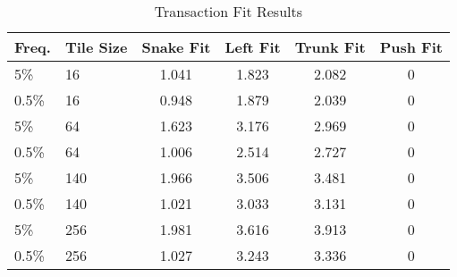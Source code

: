 \begin{table}
	\begin{center}
		\begin{tabular}{|l|l|c|c|c|c|}
			\hline
			Freq. & Tile Size & Snake Fit & Left Fit & Trunk Fit & Push Fit \\
			\hline
			5\% & 16 & 1.041 & 1.823 & 2.082 & 0 \\
			\hline
			0.5\% & 16 & 0.948 & 1.879 & 2.039 & 0 \\
			\hline
			5\% & 64 & 1.623 & 3.176 & 2.969 & 0 \\
			\hline
			0.5\% & 64 & 1.006 & 2.514 & 2.727 & 0 \\
			\hline
			5\% & 140 & 1.966 & 3.506 & 3.481 & 0 \\
			\hline
			0.5\% & 140 & 1.021 & 3.033 & 3.131 & 0 \\
			\hline
			5\% & 256 & 1.981 & 3.616 & 3.913 & 0 \\
			\hline
			0.5\% & 256 & 1.027 & 3.243 & 3.336 & 0 \\
			\hline
		\end{tabular}
	\end{center}
	\caption{Transaction Fit Results}
	\label{tab:fit}
\end{table}